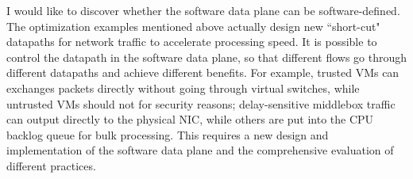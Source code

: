 I would like to discover whether the software data plane can be software-defined.
The optimization examples mentioned above actually design new ``short-cut" datapaths for
network traffic to accelerate processing speed. It is possible to control the datapath in the software
data plane, so that different flows go through different datapaths and achieve different benefits.
For example, trusted VMs can exchanges packets directly without going through virtual switches,
while untrusted VMs should not for security reasons; 
delay-sensitive middlebox traffic can output directly to
the physical NIC, while others are put into the CPU backlog queue for bulk processing. This requires
a new design and implementation of the software data plane and the comprehensive evaluation of different practices.


